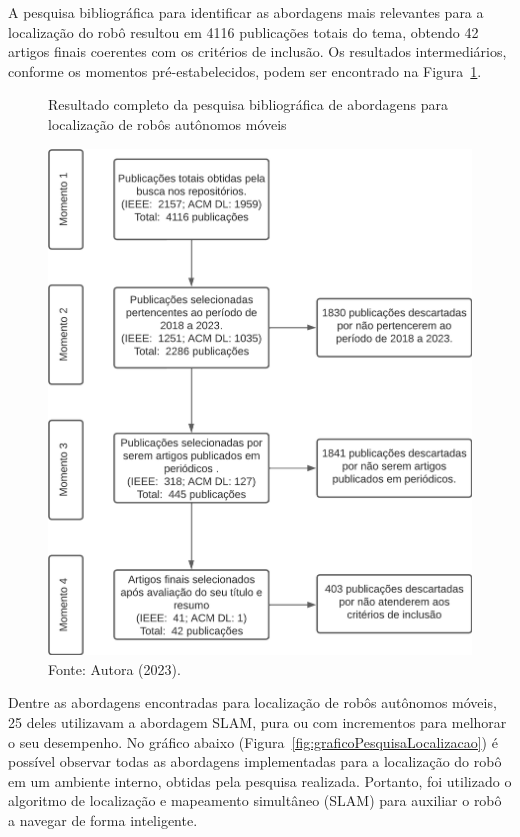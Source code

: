 A pesquisa bibliográfica para identificar as abordagens mais relevantes para a localização do robô resultou em 4116 publicações totais do tema, obtendo  42 artigos finais coerentes com os critérios de inclusão. Os resultados intermediários, conforme os momentos pré-estabelecidos, podem ser encontrado na Figura~\ref{fig:diagramaResultadosLocalizacao}. 

\begin{figure}[h]
    \centering
    \caption{Resultado completo da pesquisa bibliográfica de abordagens para localização de robôs autônomos móveis}
    \includegraphics[scale=0.8]{diagramaResultadosLocalizacao.png}
    \caption*{Fonte: Autora (2023).}
    \label{fig:diagramaResultadosLocalizacao}
\end{figure}

Dentre as abordagens encontradas para localização de robôs autônomos móveis, 25 deles utilizavam a abordagem SLAM, pura ou com incrementos para melhorar o seu desempenho. No gráfico abaixo (Figura~\ref{fig:graficoPesquisaLocalizacao}) é possível observar todas as abordagens implementadas para a localização do robô em um ambiente interno, obtidas pela pesquisa realizada. Portanto, foi utilizado o algoritmo de localização e mapeamento simultâneo (SLAM) para auxiliar o robô a navegar de forma inteligente.

